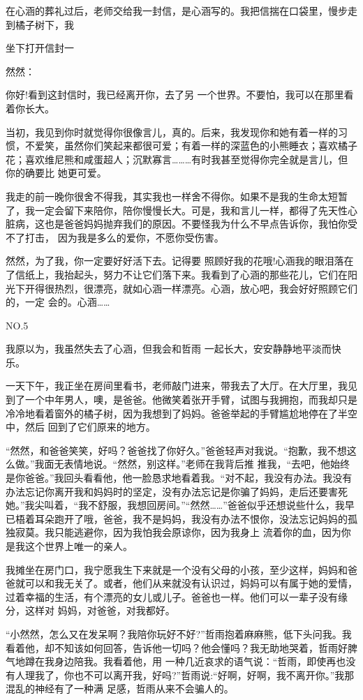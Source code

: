 \documentclass{article}
\begin{document}
在心涵的葬礼过后，老师交给我一封信，是心涵写的。我把信揣在口袋里，慢步走到橘子树下，我

\newpage
坐下打开信封一 


然然： 

你好!看到这封信时，我已经离开你，去了另
一个世界。不要怕，我可以在那里看着你长大。 

当初，我见到你时就觉得你很像言儿，真的。后来，我发现你和她有着一样的习惯，不爱笑，虽然你们笑起来都很可爱；有着一样的深蓝色的小熊睡衣；喜欢橘子花；喜欢维尼熊和咸蛋超人；沉默寡言………有时我甚至觉得你完全就是言儿，但你的确要比
她更可爱。 

我走的前一晚你很舍不得我，其实我也一样舍不得你。如果不是我的生命太短暂了，我一定会留下来陪你，陪你慢慢长大。可是，我和言儿一样，都得了先天性心脏病，这也是爸爸妈妈抛弃我们的原因。不要怪我为什么不早点告诉你，我怕你受不了打击，
因为我是多么的爱你，不愿你受伤害。 

然然，为了我，你一定要好好活下去。记得要
\newpage
照顾好我的花哦!心涵我的眼泪落在了信纸上，我抬起头，努力不让它们落下来。我看到了心涵的那些花儿，它们在阳光下开得很热烈，很漂亮，就如心涵一样漂亮。心涵，放心吧，我会好好照顾它们的，一定
会的。心涵…… 


NO.5 

我原以为，我虽然失去了心涵，但我会和哲雨
一起长大，安安静静地平淡而快乐。 

一天下午，我正坐在房间里看书，老师敲门进来，带我去了大厅。在大厅里，我见到了一个中年男人，噢，是爸爸。他微笑着张开手臂，试图与我拥抱，而我却只是冷冷地看着窗外的橘子树，因为我想到了妈妈。爸爸举起的手臂尴尬地停在了半空中，然后
回到了它们原来的地方。 

“然然，和爸爸笑笑，好吗？爸爸找了你好久。”爸爸轻声对我说。“抱歉，我不想这么做。”我面无表情地说。“然然，别这样。”老师在我背后推
\newpage
推我，“去吧，他始终是你爸爸。”我回头看看他，他一脸恳求地看着我。“对不起，我没有办法。我没有办法忘记你离开我和妈妈时的坚定，没有办法忘记是你骗了妈妈，走后还要害死她。”我尖叫着，“我不舒服，我想回房间。”“然然……”爸爸似乎还想说些什么，我早已梧着耳朵跑开了哦，爸爸，我不是妈妈，我没有办法不恨你，没法忘记妈妈的孤独寂莫。我只能逃避你，因为我怕我会原谅你，因为我身上
流着你的血，因为你是我这个世界上唯一的亲人。 

我摊坐在房门口，我宁愿我生下来就是一个没有父母的小孩，至少这样，妈妈和爸爸就可以和我无关了。或者，他们从来就没有认识过，妈妈可以有属于她的爱情，过着幸福的生活，有个漂亮的女儿或儿子。爸爸也一样。他们可以一辈子没有缘分，这样对
妈妈，对爸爸，对我都好。 

“小然然，怎么又在发呆啊？我陪你玩好不好?”哲雨抱着麻麻熊，低下头问我。我看着他，却不知该如何回答，告诉他一切吗？他会懂吗？我无助地哭着，哲雨好脾气地蹲在我身边陪我。我看着他，用
\newpage
一种几近哀求的语气说：“哲雨，即使再也没有人理我了，你也不可以离开我，好吗?”哲雨说:“好啊，好啊，我不离开你。”我那混乱的神经有了一种满
足感，哲雨从来不会骗人的。 
\end{document}
